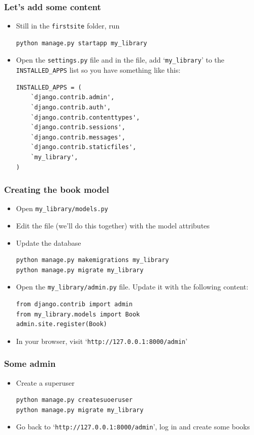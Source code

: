 \documentclass[10pt,t,xcolor=dvipsnames]{beamer}
\begin{document}
\begin{frame}[fragile]
\frametitle{Let's add some content}
\begin{itemize}[<+->]
\item Still in the \texttt{firstsite} folder, run
\begin{lstlisting}
python manage.py startapp my_library
\end{lstlisting}
\item Open the \texttt{settings.py} file and in the file, add `\texttt{my\_library}' to the \texttt{INSTALLED\_APPS} list so you have something like this:
\begin{verbatim}
INSTALLED_APPS = (
    `django.contrib.admin',
    `django.contrib.auth',
    `django.contrib.contenttypes',
    `django.contrib.sessions',
    `django.contrib.messages',
    `django.contrib.staticfiles',
    `my_library',
)
\end{verbatim}
\end{itemize}
\end{frame}
\begin{frame}[fragile]
\frametitle{Creating the book model}
\begin{itemize}[<+->]
\item Open \texttt{my\_library/models.py}
\item Edit the file (we'll do this together) with the model attributes
\item Update the database
\begin{lstlisting}
python manage.py makemigrations my_library
python manage.py migrate my_library
\end{lstlisting}
\item Open the \texttt{my\_library/admin.py} file. Update it with the following content:
\begin{verbatim}
from django.contrib import admin
from my_library.models import Book
admin.site.register(Book)
\end{verbatim}
\item In your browser, visit `\texttt{http://127.0.0.1:8000/admin}'
\end{itemize}
\end{frame}
\begin{frame}[fragile]
\frametitle{Some admin}
\begin{itemize}[<+->]
\item Create a superuser
\begin{lstlisting}
python manage.py createsuoeruser
python manage.py migrate my_library
\end{lstlisting}
\item Go back to `\texttt{http://127.0.0.1:8000/admin}', log in and create some books
\end{itemize}
\end{frame}
\end{document}
